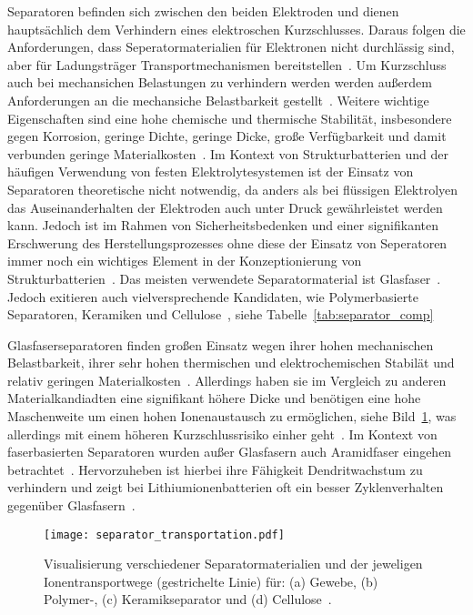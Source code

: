 Separatoren befinden sich zwischen den beiden Elektroden und dienen hauptsächlich dem Verhindern eines elektroschen Kurzschlusses. Daraus folgen die Anforderungen, dass Seperatormaterialien für Elektronen nicht durchlässig sind, aber für Ladungsträger Transportmechanismen bereitstellen~\cite{Kurzweil2015}. Um Kurzschluss auch bei mechansichen Belastungen zu verhindern werden werden außerdem Anforderungen an die mechansiche Belastbarkeit gestellt~\cite{Asp2015}. Weitere wichtige Eigenschaften sind eine hohe chemische und thermische Stabilität, insbesondere gegen Korrosion, geringe Dichte, geringe Dicke, große Verfügbarkeit und damit verbunden geringe Materialkosten~\cite{Beard2019}. Im Kontext von Strukturbatterien und der häufigen Verwendung von festen Elektrolytesystemen ist der Einsatz von Separatoren theoretische nicht notwendig, da anders als bei flüssigen Elektrolyen das Auseinanderhalten der Elektroden auch unter Druck gewährleistet werden kann. Jedoch ist im Rahmen von Sicherheitsbedenken und einer signifikanten Erschwerung des Herstellungsprozesses ohne diese der Einsatz von Seperatoren immer noch ein wichtiges Element in der Konzeptionierung von Strukturbatterien~\cite{Asp2015, Hubert2022}.
Das meisten verwendete Separatormaterial ist Glasfaser~\cite{Zhou2022}. Jedoch exitieren auch vielversprechende Kandidaten, wie Polymerbasierte Separatoren, Keramiken und Cellulose~\cite{Simon2008, Greenhalgh2023}, siehe Tabelle~\ref{tab:separator_comp}


Glasfaserseparatoren finden großen Einsatz wegen ihrer hohen mechanischen Belastbarkeit, ihrer sehr hohen thermischen und elektrochemischen Stabilät und relativ geringen Materialkosten~\cite{Luo2015,Asp2019,Asp2021,Liu2022}. Allerdings haben sie im Vergleich zu anderen Materialkandiadten eine signifikant höhere Dicke und benötigen eine hohe Maschenweite um einen hohen Ionenaustausch zu ermöglichen, siehe Bild~\ref{fig:separator_transportation}, was allerdings mit einem höheren Kurzschlussrisiko einher geht~\cite{Danzi2021,Zhou2022}. 
Im Kontext von faserbasierten Separatoren wurden außer Glasfasern auch Aramidfaser eingehen betrachtet~\cite{Jin2023}. Hervorzuheben ist hierbei ihre Fähigkeit Dendritwachstum zu verhindern und zeigt bei Lithiumionenbatterien oft ein besser Zyklenverhalten gegenüber Glasfasern~\cite{Tung2015,Wang2021a}.
\begin{figure}[h]
        \center
	\texttt{[image: separator\_transportation.pdf]}
		\caption{\label{fig:separator_transportation}Visualisierung verschiedener Separatormaterialien und der jeweligen Ionentransportwege (gestrichelte Linie) für: (a) Gewebe, (b) Polymer-, (c) Keramikseparator und (d) Cellulose~\cite{Zschiebsch2024}.}
\end{figure}


